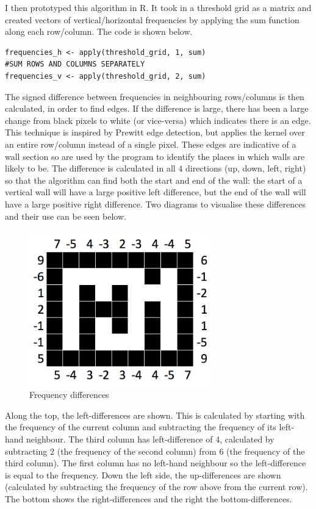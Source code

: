 \documentclass[titlepage]{article}
\begin{document}
I then prototyped this algorithm in R. It took in a threshold grid as a matrix and created vectors of vertical/horizontal frequencies by applying the sum function along each row/column. The code is shown below.

\begin{changemargin}{-1in}{-1in} 
\begin{verbatim}
frequencies_h <- apply(threshold_grid, 1, sum)                                  #SUM ROWS AND COLUMNS SEPARATELY
frequencies_v <- apply(threshold_grid, 2, sum)
\end{verbatim}
\end{changemargin} 


The signed difference between frequencies in neighbouring rows/columns is then calculated, in order to find edges. If the difference is large, there has been a large change from black pixels to white (or vice-versa) which indicates there is an edge. This technique is inspired by Prewitt edge detection, but applies the kernel over an entire row/column instead of a single pixel. These edges are indicative of a wall section so are used by the program to identify the places in which walls are likely to be. The difference is calculated in all 4 directions (up, down, left, right) so that the algorithm can find both the start and end of the wall: the start of a vertical wall will have a large positive left difference, but the end of the wall will have a large positive right difference. Two diagrams to visualise these differences and their use can be seen below.

\begin{figure}[H]
  \centering
  \includegraphics[width=8cm]{differences.png}
  \caption{Frequency differences}
  \label{fig:dijk}
\end{figure}

Along the top, the left-differences are shown. This is calculated by starting with the frequency of the current column and subtracting the frequency of its left-hand neighbour. The third column has left-difference of 4, calculated by subtracting 2 (the frequency of the second column) from 6 (the frequency of the third column). The first column has no left-hand neighbour so the left-difference is equal to the frequency. Down the left side, the up-differences are shown (calculated by subtracting the frequency of the row above from the current row). The bottom shows the right-differences and the right the bottom-differences.
\end{document}
